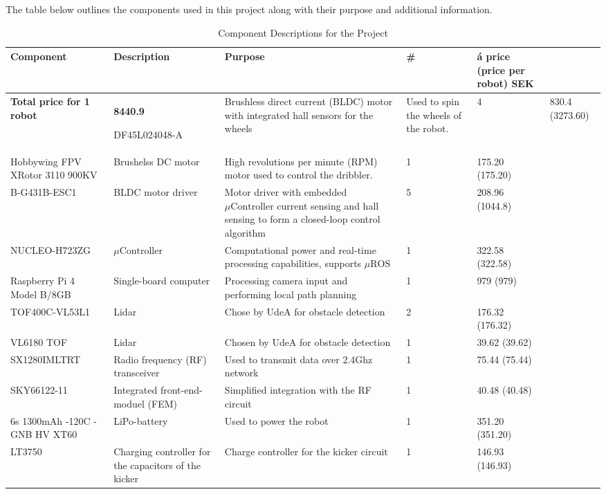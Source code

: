 \documentclass[a4paper,8pt]{article}
\begin{document}
  The table below outlines the components used in this project along
  with their purpose and additional information.
  \begin{center}
    \begin{longtable}{|p{3cm}|p{3cm}|p{3cm}|p{1cm}|p{3cm}| }
      \caption{Component Descriptions for the Project}
      \\ \hline {} \textbf{Component} & \textbf{Description} & \textbf{Purpose} & \textbf{\#} & \textbf{á price (price per robot) SEK}\\ \endhead \hline

       \textbf{Total price for 1 robot} & \textbf{8440.9} \endlastfoot \hline

      DF45L024048-A & Brushless direct current (BLDC) motor with integrated hall sensors for the wheels & Used to spin the wheels of the robot. & 4 & 830.4 (3273.60)\\ \hline 
      Hobbywing FPV XRotor 3110 900KV & Brushelss DC motor & High revolutions per minute (RPM) motor used to control the dribbler. & 1 & 175.20 (175.20) \\ \hline 
      B-G431B-ESC1 & BLDC motor driver & Motor driver with embedded $\mu\text{Controller}$ current sensing and hall sensing to form a closed-loop control algorithm & 5 & 208.96 (1044.8) \\ \hline 
      NUCLEO-H723ZG & $\mu\text{Controller}$ & Computational power and real-time processing capabilities, supports $\mu\text{ROS}$ & 1 & 322.58 (322.58) \\ \hline 
      Raspberry Pi 4 Model B/8GB & Single-board computer & Processing camera input and performing local path planning & 1 & 979 (979) \\ \hline
      TOF400C-VL53L1 & Lidar & Chose by UdeA for obstacle detection & 2 & 176.32 (176.32) \\ \hline
      VL6180 TOF & Lidar & Chosen by UdeA for obstacle detection & 1 & 39.62 (39.62) \\ \hline
      SX1280IMLTRT & Radio frequency (RF) transceiver & Used to transmit data over 2.4Ghz network & 1 & 75.44 (75.44) \\ \hline 
      SKY66122-11 & Integrated front-end-moduel (FEM) & Simplified integration with the RF circuit & 1 & 40.48 (40.48) \\ \hline 
      6s 1300mAh -120C - GNB HV XT60 & LiPo-battery & Used to power the robot & 1 & 351.20 (351.20) \\ \hline 
      LT3750 & Charging controller for the capacitors of the kicker & Charge controller for the kicker circuit & 1 & 146.93 (146.93)\\ \hline 

\end{longtable}
\end{center}
\end{document}
